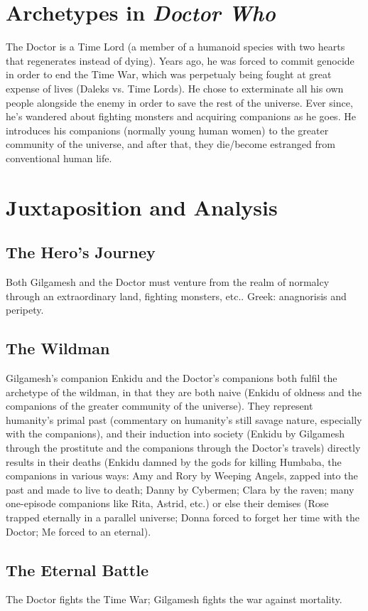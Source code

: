 \documentclass[10pt,a4paper]{article}
\begin{document}
\section{Archetypes in \emph{Doctor Who}}
The Doctor is a Time Lord (a member of a humanoid species with two hearts that regenerates instead of dying). Years ago, he was forced to commit genocide in order to end the Time War, which was perpetualy being fought at great expense of lives (Daleks vs. Time Lords). He chose to exterminate all his own people alongside the enemy in order to save the rest of the universe. Ever since, he's wandered about fighting monsters and acquiring companions as he goes. He introduces his companions (normally young human women) to the greater community of the universe, and after that, they die/become estranged from conventional human life.

\section{Juxtaposition and Analysis}     
\subsection{The Hero's Journey}
Both Gilgamesh and the Doctor must venture from the realm of normalcy through an extraordinary land, fighting monsters, etc.. Greek: anagnorisis and peripety.

\subsection{The Wildman}
    Gilgamesh's companion Enkidu and the Doctor's companions both fulfil the archetype of the wildman, in that they are both naive (Enkidu of oldness and the companions of the greater community of the universe). They represent humanity's primal past (commentary on humanity's still savage nature, especially with the companions), and their induction into society (Enkidu by Gilgamesh through the prostitute and the companions through the Doctor's travels) directly results in their deaths (Enkidu damned by the gods for killing Humbaba, the companions in various ways: Amy and Rory by Weeping Angels, zapped into the past and made to live to death; Danny by Cybermen; Clara by the raven; many one-episode companions like Rita, Astrid, etc.) or else their demises (Rose trapped eternally in a parallel universe; Donna forced to forget her time with the Doctor; Me forced to an eternal).
    
\subsection{The Eternal Battle}
The Doctor fights the Time War; Gilgamesh fights the war against mortality.
\end{document}
